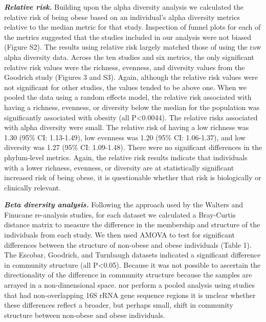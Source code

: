 \documentclass[12pt,]{article}
\begin{document}
\textbf{\emph{Relative risk.}} Building upon the alpha diversity
analysis we calculated the relative risk of being obese based on an
individual's alpha diversity metrics relative to the median metric for
that study. Inspection of funnel plots for each of the metrics suggested
that the studies included in our analysis were not biased (Figure S2).
The results using relative risk largely matched those of using the raw
alpha diversity data. Across the ten studies and six metrics, the only
significant relative risk values were the richness, evenness, and
diversity values from the Goodrich study (Figures 3 and S3). Again,
although the relative risk values were not significant for other
studies, the values tended to be above one. When we pooled the data
using a random effects model, the relative risk associated with having a
richness, evenness, or diversity below the median for the population was
significantly associated with obesity (all P\textless{}0.0044). The
relative risks associated with alpha diversity were small. The relative
risk of having a low richness was 1.30 (95\% CI: 1.13-1.49), low
evenness was 1.20 (95\% CI: 1.06-1.37), and low diversity was 1.27 (95\%
CI: 1.09-1.48). There were no significant differences in the
phylum-level metrics. Again, the relative risk results indicate that
individuals with a lower richness, evenness, or diversity are at
statistically significant increased risk of being obese, it is
questionable whether that risk is biologically or clinically relevant.

\textbf{\emph{Beta diversity analysis.}} Following the approach used by
the Walters and Finucane re-analysis studies, for each dataset we
calculated a Bray-Curtis distance matrix to measure the difference in
the membership and structure of the individuals from each study. We then
used AMOVA to test for significant differences between the structure of
non-obese and obese individuals (Table 1). The Escobar, Goodrich, and
Turnbaugh datasets indicated a significant difference in community
structure (all P\textless{}0.05). Because it was not possible to
ascertain the directionality of the difference in community structure
because the samples are arrayed in a non-dimensional space. nor perform
a pooled analysis using studies that had non-overlapping 16S rRNA gene
sequence regions it is unclear whether these differences reflect a
broader, but perhaps small, shift in community structure between
non-obese and obese individuals.
\end{document}
